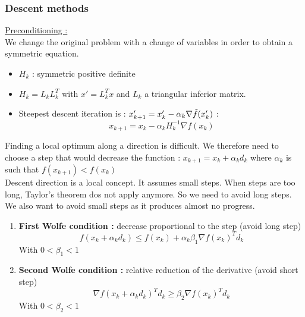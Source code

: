 \documentclass[../main.tex]{subfiles}
\begin{document}
\subsubsection{Descent methods}

\quad \underline{Preconditioning :}\\

We change the original problem with a change of variables in order to obtain a symmetric equation.\\

\begin{itemize}
    \item $H_k$ : symmetric positive definite\\
    \item $H_k = L_k L_k^T$ with $x' = L_k^Tx$ and $L_k$ a triangular inferior matrix.\\
    \item Steepest descent iteration is : $x_{k+1}' = x_k' - \alpha_k \nabla \Tilde{f}(x_k')$ : \begin{equation}
        x_{k+1} = x_k - \alpha_k H_k^{-1} \nabla f(x_k)
    \end{equation}
\end{itemize}

Finding a local optimum along a direction is difficult. We therefore need to choose a step that would decrease the function : $x_{k+1} = x_k + \alpha_k d_k$ where $\alpha_k$ is such that $f(x_{k+1})<f(x_k)$\\

Descent direction is a local concept. It assumes small steps. When steps are too long, Taylor's theorem dos not apply anymore. So we need to avoid long steps. We also want to avoid small steps as it produces almost no progress.\\

\begin{enumerate}
    \item \textbf{First Wolfe condition :} decrease proportional to the step (avoid long step) \begin{equation}
        f(x_k + \alpha_k d_k) \leq f(x_k) + \alpha_k \beta_1 \nabla f(x_k)^Td_k
    \end{equation}
    With $0<\beta_1<1$\\
    \item \textbf{Second Wolfe condition :} relative reduction of the derivative (avoid short step) \begin{equation}
        \nabla f(x_k+\alpha_k d_k)^Td_k \geq \beta_2 \nabla f(x_k)^Td_k
    \end{equation} With $0<\beta_2<1$\\
\end{enumerate}
\end{document}
